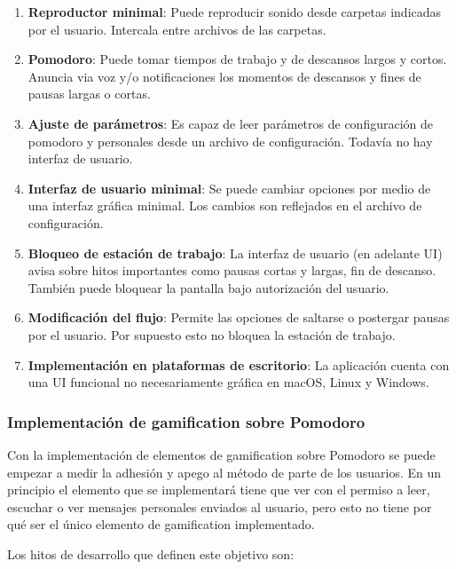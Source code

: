 \documentclass[12pt,letterpaper]{report}
\providecommand{\tightlist}{%
  \setlength{\itemsep}{0pt}\setlength{\parskip}{0pt}}
\begin{document}
\begin{enumerate}\tightlist{}
  \item \textbf{Reproductor minimal}: Puede reproducir sonido desde
carpetas indicadas por el usuario. Intercala entre archivos de las
carpetas.
  \item \textbf{Pomodoro}: Puede tomar tiempos de trabajo y de
descansos largos y cortos. Anuncia via voz y/o notificaciones los
momentos de descansos y fines de pausas largas o cortas.
  \item \textbf{Ajuste de parámetros}: Es capaz de leer parámetros de
configuración de pomodoro y personales desde un archivo de
configuración. Todavía no hay interfaz de usuario.
  \item \textbf{Interfaz de usuario minimal}: Se puede cambiar
opciones por medio de una interfaz gráfica minimal. Los cambios son
reflejados en el archivo de configuración.
  \item \textbf{Bloqueo de estación de trabajo}: La interfaz de
usuario (en adelante UI) avisa sobre hitos importantes como pausas
cortas y largas, fin de descanso. También puede bloquear la pantalla
bajo autorización del usuario.
  \item \textbf{Modificación del flujo}: Permite las opciones de
saltarse o postergar pausas por el usuario. Por supuesto esto no
bloquea la estación de trabajo.
  \item \textbf{Implementación en plataformas de escritorio}: La
aplicación cuenta con una UI funcional no necesariamente gráfica en
macOS, Linux y Windows.
\end{enumerate}

\subsubsection{Implementación de gamification sobre Pomodoro}\label{implementacion-de-gamification-sobre-pomodoro}

Con la implementación de elementos de gamification sobre Pomodoro se
puede empezar a medir la adhesión y apego al método de parte de los
usuarios. En un principio el elemento que se implementará tiene que
ver con el permiso a leer, escuchar o ver mensajes personales enviados
al usuario, pero esto no tiene por qué ser el único elemento de
gamification implementado.

Los hitos de desarrollo que definen este objetivo son:
\end{document}
